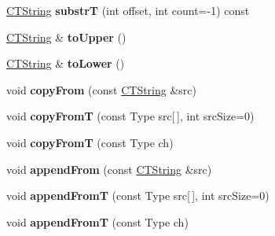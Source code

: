 \begin{DoxyCompactItemize}
\item 
\hypertarget{classps_1_1base_1_1CTString_a623cbf8641273ff2f105bc4bf3211c69}{}\hyperlink{classps_1_1base_1_1CTString}{C\+T\+String} {\bfseries substr\+T} (int offset, int count=-\/1) const \label{classps_1_1base_1_1CTString_a623cbf8641273ff2f105bc4bf3211c69}

\item 
\hypertarget{classps_1_1base_1_1CTString_a34620510adbfde432445cb87152a1be2}{}\hyperlink{classps_1_1base_1_1CTString}{C\+T\+String} \& {\bfseries to\+Upper} ()\label{classps_1_1base_1_1CTString_a34620510adbfde432445cb87152a1be2}

\item 
\hypertarget{classps_1_1base_1_1CTString_a14e395c306ce9730509bf965cd280426}{}\hyperlink{classps_1_1base_1_1CTString}{C\+T\+String} \& {\bfseries to\+Lower} ()\label{classps_1_1base_1_1CTString_a14e395c306ce9730509bf965cd280426}

\item 
\hypertarget{classps_1_1base_1_1CTString_a14ae1d1d8160164a60007af05fba46ec}{}void {\bfseries copy\+From} (const \hyperlink{classps_1_1base_1_1CTString}{C\+T\+String} \&src)\label{classps_1_1base_1_1CTString_a14ae1d1d8160164a60007af05fba46ec}

\item 
\hypertarget{classps_1_1base_1_1CTString_a50c49b425056b648fb6b61c610d6ecb6}{}void {\bfseries copy\+From\+T} (const Type src\mbox{[}$\,$\mbox{]}, int src\+Size=0)\label{classps_1_1base_1_1CTString_a50c49b425056b648fb6b61c610d6ecb6}

\item 
\hypertarget{classps_1_1base_1_1CTString_afe98fe0b2061758772da4606f0501c43}{}void {\bfseries copy\+From\+T} (const Type ch)\label{classps_1_1base_1_1CTString_afe98fe0b2061758772da4606f0501c43}

\item 
\hypertarget{classps_1_1base_1_1CTString_ae6ee20fda8c1995aa855b4da2d935427}{}void {\bfseries append\+From} (const \hyperlink{classps_1_1base_1_1CTString}{C\+T\+String} \&src)\label{classps_1_1base_1_1CTString_ae6ee20fda8c1995aa855b4da2d935427}

\item 
\hypertarget{classps_1_1base_1_1CTString_a5cc5349f1760e9036884b5f4a3a36667}{}void {\bfseries append\+From\+T} (const Type src\mbox{[}$\,$\mbox{]}, int src\+Size=0)\label{classps_1_1base_1_1CTString_a5cc5349f1760e9036884b5f4a3a36667}

\item 
\hypertarget{classps_1_1base_1_1CTString_a9ce60279acedd24e2122384486726513}{}void {\bfseries append\+From\+T} (const Type ch)\label{classps_1_1base_1_1CTString_a9ce60279acedd24e2122384486726513}


\end{DoxyCompactItemize}

